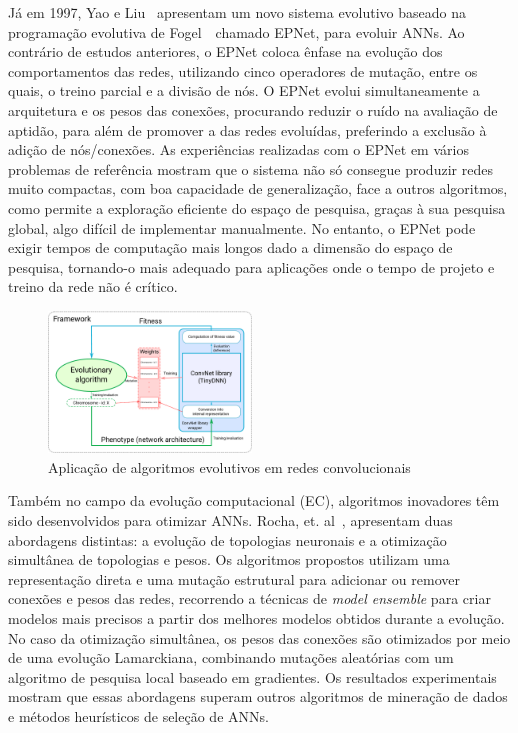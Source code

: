 Já em 1997, Yao e Liu~\cite{Yao1997ANetworks} apresentam um novo sistema evolutivo baseado na programação evolutiva de Fogel~\cite{Fogel1990EvolvingNetworks}\, chamado EPNet, para evoluir ANNs. Ao contrário de estudos anteriores, o EPNet coloca ênfase na evolução dos comportamentos das redes, utilizando cinco operadores de mutação, entre os quais, o treino parcial e a divisão de nós.
O EPNet evolui simultaneamente a arquitetura e os pesos das conexões, procurando reduzir o ruído na avaliação de aptidão, para além de promover a  das redes evoluídas, preferindo a exclusão à adição de nós/conexões.
As experiências realizadas com o EPNet em vários problemas de referência mostram que o sistema não só consegue produzir redes muito compactas, com boa capacidade de generalização, face a outros algoritmos, como permite a exploração eficiente do espaço de pesquisa, graças à sua pesquisa global, algo difícil de implementar manualmente.
No entanto, o EPNet pode exigir tempos de computação mais longos dado a dimensão do espaço de pesquisa, tornando-o mais adequado para aplicações onde o tempo de projeto e treino da rede não é crítico.

\begin{figure}[htbp]
    \centering
    \includegraphics[width=0.48\textwidth]{imagens/evo_alg3}
    \caption{Aplicação de algoritmos evolutivos em redes convolucionais\cite{Badan2019EvolutionaryDesign}}
    \label{fig:evo_alg_cnn}
\end{figure}

Também no campo da evolução computacional (EC), algoritmos inovadores têm sido desenvolvidos para otimizar ANNs. Rocha, et.
al~\cite{Rocha2007EvolutionRegression}, apresentam duas abordagens distintas: a evolução de topologias neuronais e a otimização simultânea de topologias e pesos.
Os algoritmos propostos utilizam uma representação direta e uma mutação estrutural para adicionar ou remover conexões e pesos das redes, recorrendo a técnicas de \textit{model ensemble} para criar modelos mais precisos a partir dos melhores modelos obtidos durante a evolução.
No caso da otimização simultânea, os pesos das conexões são otimizados por meio de uma evolução Lamarckiana, combinando mutações aleatórias com um algoritmo de pesquisa local baseado em gradientes.
Os resultados experimentais mostram que essas abordagens superam outros algoritmos de mineração de dados e métodos heurísticos de seleção de ANNs.

